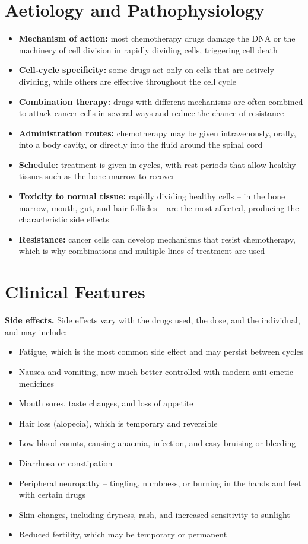\section*{Aetiology and Pathophysiology}
\begin{itemize}
    \item \textbf{Mechanism of action:} most chemotherapy drugs damage the DNA or the machinery of cell division in rapidly dividing cells, triggering cell death
    \item \textbf{Cell-cycle specificity:} some drugs act only on cells that are actively dividing, while others are effective throughout the cell cycle
    \item \textbf{Combination therapy:} drugs with different mechanisms are often combined to attack cancer cells in several ways and reduce the chance of resistance
    \item \textbf{Administration routes:} chemotherapy may be given intravenously, orally, into a body cavity, or directly into the fluid around the spinal cord
    \item \textbf{Schedule:} treatment is given in cycles, with rest periods that allow healthy tissues such as the bone marrow to recover
    \item \textbf{Toxicity to normal tissue:} rapidly dividing healthy cells -- in the bone marrow, mouth, gut, and hair follicles -- are the most affected, producing the characteristic side effects
    \item \textbf{Resistance:} cancer cells can develop mechanisms that resist chemotherapy, which is why combinations and multiple lines of treatment are used
\end{itemize}

\section*{Clinical Features}
\medskip
\textbf{Side effects.} Side effects vary with the drugs used, the dose, and the individual, and may include:
\begin{itemize}
    \item Fatigue, which is the most common side effect and may persist between cycles
    \item Nausea and vomiting, now much better controlled with modern anti-emetic medicines
    \item Mouth sores, taste changes, and loss of appetite
    \item Hair loss (alopecia), which is temporary and reversible
    \item Low blood counts, causing anaemia, infection, and easy bruising or bleeding
    \item Diarrhoea or constipation
    \item Peripheral neuropathy -- tingling, numbness, or burning in the hands and feet with certain drugs
    \item Skin changes, including dryness, rash, and increased sensitivity to sunlight
    \item Reduced fertility, which may be temporary or permanent
\end{itemize}

